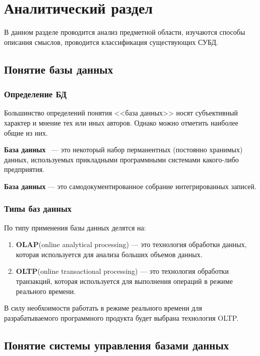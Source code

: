 \chapter{Аналитический раздел}

В данном разделе проводится анализ предметной области, изучаются способы описания смыслов, проводится классификация существующих СУБД.

\section{Понятие базы данных}

\subsection{Определение БД}

Большинство определений понятия <<база данных>> носят субъективный характер и мнение тех или иных авторов.
Однако можно отметить наиболее общие из них.

\textbf{База данных}~\cite{date} --- это некоторый набор перманентных (постоянно хранимых) данных, используемых прикладными программными системами какого-либо предприятия.

\textbf{База данных} --- это самодокументированное собрание интегрированных записей.

\subsection{Типы баз данных}

По типу применения базы данных делятся на:

\begin{enumerate}[label=\arabic*.]
	\item \textbf{OLAP}(online analytical processing) --- это технология обработки данных, которая используется для анализа больших объемов данных.
	\item \textbf{OLTP}(online transactional processing) --- это технология обработки транзакций, которая используется для выполнения операций в режиме реального времени.
\end{enumerate}

В силу необхоимости работать в режиме реального времени для разрабатываемого программного продукта будет выбрана технология OLTP.

\section{Понятие системы управления базами данных}

